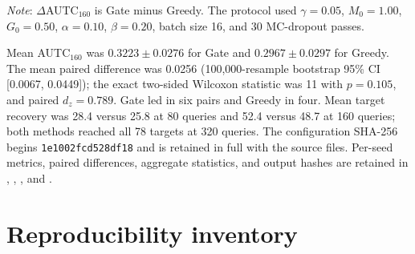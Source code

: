\documentclass[cmc,article,submit,moreauthors,pdftex]{Definitions/tsp}
\newcommand{\tabnote}[1]{\par\smallskip\noindent\begin{minipage}{\linewidth}\footnotesize\emph{Note}: #1\end{minipage}\par}
\begin{document}
\begin{table}[H]
\centering
\caption{Per-seed frozen held-out comparison for Energy-Gated DA-TPP and
Predicted-Target Greedy.}
\label{tab:s-gamma005-holdout}
\tablesize{\scriptsize}
\resizebox{\textwidth}{!}{}
\tabnote{$\Delta$AUTC$_{160}$ is Gate minus Greedy. The protocol used
$\gamma=0.05$, $M_0=1.00$, $G_0=0.50$, $\alpha=0.10$, $\beta=0.20$, batch size
16, and 30 MC-dropout passes.}
\end{table}

Mean AUTC$_{160}$ was $0.3223\pm0.0276$ for Gate and
$0.2967\pm0.0297$ for Greedy. The mean paired difference was 0.0256
(100,000-resample bootstrap 95\% CI [0.0067, 0.0449]); the exact two-sided
Wilcoxon statistic was 11 with $p=0.105$, and paired $d_z=0.789$. Gate led in
six pairs and Greedy in four. Mean target recovery was 28.4 versus 25.8 at 80
queries and 52.4 versus 48.7 at 160 queries; both methods reached all 78 targets
at 320 queries. The configuration SHA-256 begins
\texttt{1e1002fcd528df18} and is retained in full with the source files.
Per-seed metrics, paired differences, aggregate statistics, and output hashes
are retained in
,
,
,
and
.

\section{Reproducibility inventory}
\end{document}
